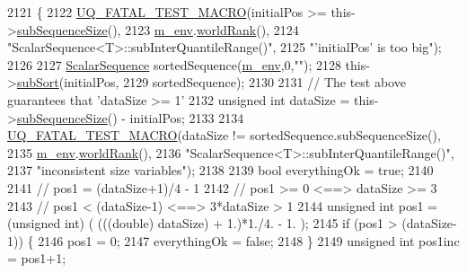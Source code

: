 \begin{DoxyCode}
2121 \{
2122   \hyperlink{_defines_8h_a56d63d18d0a6d45757de47fcc06f574d}{UQ\_FATAL\_TEST\_MACRO}(initialPos >= this->\hyperlink{class_q_u_e_s_o_1_1_scalar_sequence_a0288ea295eedc216a1617b3286f6f3a0}{subSequenceSize}(),
2123                       \hyperlink{class_q_u_e_s_o_1_1_scalar_sequence_a71618cd6351b29361b437af68447a4c8}{m\_env}.\hyperlink{class_q_u_e_s_o_1_1_base_environment_a78b57112bbd0e6dd0e8afec00b40ffa7}{worldRank}(),
2124                       \textcolor{stringliteral}{"ScalarSequence<T>::subInterQuantileRange()"},
2125                       \textcolor{stringliteral}{"'initialPos' is too big"});
2126 
2127   \hyperlink{class_q_u_e_s_o_1_1_scalar_sequence_af7084e62a902ffefc8a49e317ac45e7c}{ScalarSequence} sortedSequence(\hyperlink{class_q_u_e_s_o_1_1_scalar_sequence_a71618cd6351b29361b437af68447a4c8}{m\_env},0,\textcolor{stringliteral}{""});
2128   this->\hyperlink{class_q_u_e_s_o_1_1_scalar_sequence_ae0cf4dcb27543caefc38e921968cdb6c}{subSort}(initialPos,
2129                 sortedSequence);
2130 
2131   \textcolor{comment}{// The test above guarantees that 'dataSize >= 1'}
2132   \textcolor{keywordtype}{unsigned} \textcolor{keywordtype}{int} dataSize = this->\hyperlink{class_q_u_e_s_o_1_1_scalar_sequence_a0288ea295eedc216a1617b3286f6f3a0}{subSequenceSize}() - initialPos;
2133 
2134   \hyperlink{_defines_8h_a56d63d18d0a6d45757de47fcc06f574d}{UQ\_FATAL\_TEST\_MACRO}(dataSize != sortedSequence.subSequenceSize(),
2135                       \hyperlink{class_q_u_e_s_o_1_1_scalar_sequence_a71618cd6351b29361b437af68447a4c8}{m\_env}.\hyperlink{class_q_u_e_s_o_1_1_base_environment_a78b57112bbd0e6dd0e8afec00b40ffa7}{worldRank}(),
2136                       \textcolor{stringliteral}{"ScalarSequence<T>::subInterQuantileRange()"},
2137                       \textcolor{stringliteral}{"inconsistent size variables"});
2138 
2139   \textcolor{keywordtype}{bool} everythingOk = \textcolor{keyword}{true};
2140 
2141   \textcolor{comment}{// pos1 = (dataSize+1)/4 - 1}
2142   \textcolor{comment}{// pos1 >= 0            <==> dataSize   >= 3}
2143   \textcolor{comment}{// pos1 <  (dataSize-1) <==> 3*dataSize >  1 }
2144   \textcolor{keywordtype}{unsigned} \textcolor{keywordtype}{int} pos1 = (\textcolor{keywordtype}{unsigned} int) ( (((\textcolor{keywordtype}{double}) dataSize) + 1.)*1./4. - 1. );
2145   \textcolor{keywordflow}{if} (pos1 > (dataSize-1)) \{
2146     pos1 = 0;
2147     everythingOk = \textcolor{keyword}{false};
2148   \}
2149   \textcolor{keywordtype}{unsigned} \textcolor{keywordtype}{int} pos1inc = pos1+1;

\end{DoxyCode}
